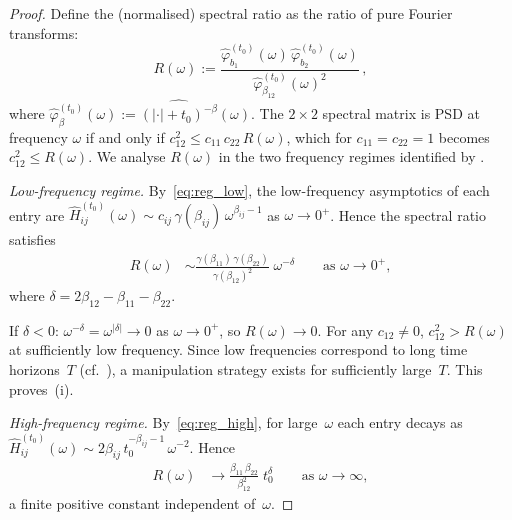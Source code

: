 \documentclass[12pt]{article}
\theoremstyle{definition}
\theoremstyle{remark}
\begin{document}
\begin{proof}
Define the (normalised) spectral ratio as the ratio of pure Fourier transforms:
\begin{equation}\label{eq:spectral_ratio}
  R(\omega) := \frac{\widehat{\varphi}_{b_1}^{(t_0)}(\omega)\,\widehat{\varphi}_{b_2}^{(t_0)}(\omega)}
    {\widehat{\varphi}_{\beta_{12}}^{(t_0)}(\omega)^2}\,,
\end{equation}
where $\widehat{\varphi}_\beta^{(t_0)}(\omega) := \widehat{(|\cdot|{+}t_0)^{-\beta}}(\omega)$.
The $2\times 2$ spectral matrix is PSD at frequency $\omega$ if and only if
$c_{12}^2 \le c_{11}\,c_{22}\,R(\omega)$, which for $c_{11}=c_{22}=1$ becomes $c_{12}^2 \le R(\omega)$.  We analyse $R(\omega)$ in the two frequency regimes
identified by .

\medskip\noindent
\emph{Low-frequency regime.}
By~\eqref{eq:reg_low}, the low-frequency asymptotics of each entry are
$\widehat{H}_{ij}^{(t_0)}(\omega)\sim c_{ij}\,\gamma(\beta_{ij})\,\omega^{\beta_{ij}-1}$
as $\omega\to 0^+$.
Hence the spectral ratio satisfies
\begin{align}
  R(\omega) &\sim
    \frac{\gamma(\beta_{11})\,\gamma(\beta_{22})}{\gamma(\beta_{12})^2}
    \;\omega^{-\delta}
    \qquad\text{as }\omega\to 0^+,
  \label{eq:R_low}
\end{align}
where $\delta = 2\beta_{12}-\beta_{11}-\beta_{22}$.

If $\delta < 0$: $\omega^{-\delta} = \omega^{|\delta|}\to 0$ as $\omega\to 0^+$,
so $R(\omega)\to 0$.  For any $c_{12}\neq 0$,
$c_{12}^2 > R(\omega)$ at sufficiently low frequency.  Since low frequencies
correspond to long time horizons~$T$
(cf.~\cite[\S2]{AlfonsiKlockSchied2016}), a manipulation
strategy exists for sufficiently large~$T$.  This proves~(i).

\medskip\noindent
\emph{High-frequency regime.}
By~\eqref{eq:reg_high}, for large~$\omega$ each entry decays as
$\widehat{H}_{ij}^{(t_0)}(\omega) \sim 2\beta_{ij}\,t_0^{-\beta_{ij}-1}\,\omega^{-2}$.
Hence
\begin{align}
  R(\omega) &\to
    \frac{\beta_{11}\,\beta_{22}}{\beta_{12}^2}\;t_0^{\delta}
    \qquad\text{as }\omega\to\infty,
  \label{eq:R_high}
\end{align}
a finite positive constant independent of~$\omega$.


\end{proof}
\end{document}
